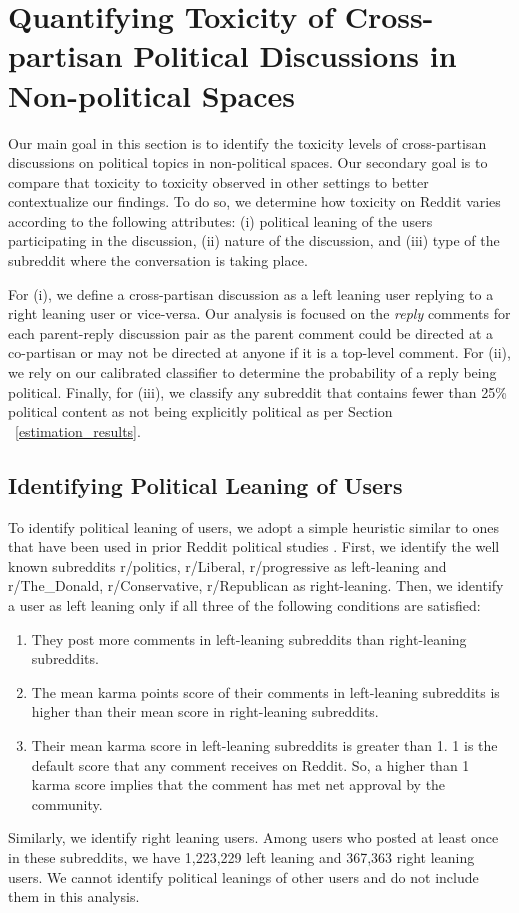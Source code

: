 \documentclass[letterpaper]{article} %
\begin{document}
\section{Quantifying Toxicity of Cross-partisan Political Discussions in Non-political Spaces}

Our main goal in this section is to identify the toxicity levels of cross-partisan discussions on political topics in non-political spaces. 
Our secondary goal is to compare that toxicity to toxicity observed in other settings to better contextualize our findings. To do so, we determine how toxicity on Reddit varies according to the following attributes: (i) political leaning of the users participating in the discussion, (ii) nature of the discussion, and (iii) type of the subreddit where the conversation is taking place. 

For (i), we define a cross-partisan discussion as a left leaning user replying to a right leaning user or vice-versa.
Our analysis is focused on the \textit{reply} comments for each parent-reply discussion pair as the parent comment could be directed at a co-partisan or may not be directed at anyone if it is a top-level comment. 
For (ii), we rely on our calibrated classifier to determine the probability of a reply being political. Finally, for (iii), we classify any subreddit that contains fewer than 25\% political content as not being explicitly political as per Section ~\ref{estimation_results}.

\subsection{Identifying Political Leaning of Users}
To identify political leaning of users, we adopt a simple heuristic similar to ones that have been used in prior Reddit political studies \cite{an2019political,soliman2019characterization}. First, we identify the well known subreddits r/politics, r/Liberal, r/progressive as left-leaning and r/The\_Donald, r/Conservative, r/Republican as right-leaning. Then, we identify a user as left leaning only if all three of the following conditions are satisfied:
\begin{enumerate}
    \item They post more comments in left-leaning subreddits than right-leaning subreddits.
    \item The mean karma points score of their comments in left-leaning subreddits is higher than their mean score in right-leaning subreddits.
    \item Their mean karma score in left-leaning subreddits is greater than 1. 1 is the default score that any comment receives on Reddit. So, a higher than 1 karma score implies that the comment has met net approval by the community.
\end{enumerate}
Similarly, we identify right leaning users. Among users who posted at least once in these subreddits, we have 1,223,229 left leaning and 367,363 right leaning users. We cannot identify  political leanings of other users and do not include them in this analysis. 
\end{document}
